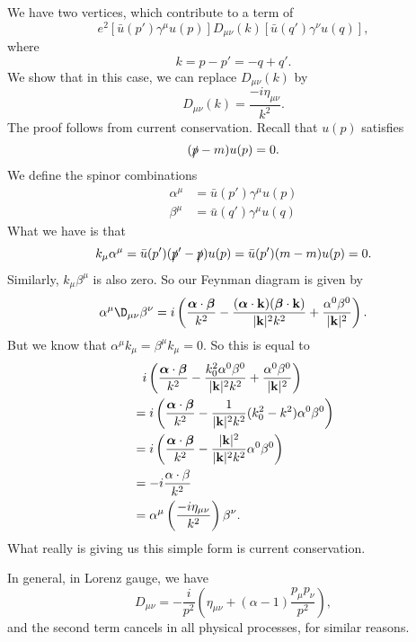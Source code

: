 \documentclass[a4paper]{article}
\begin{document}
\begin{eg}
\begin{center}
  \end{center}
  We have two vertices, which contribute to a term of
  \[
    e^2 [\bar{u}(p') \gamma^\mu u(p)] D_{\mu\nu}(k)[\bar{u}(q') \gamma^\nu u(q)],
  \]
  where
  \[
    k = p - p' = -q + q'.
  \]
  We show that in this case, we can replace $D_{\mu\nu}(k)$ by
  \[
    D_{\mu\nu}(k) = \frac{-i \eta_{\mu\nu}}{k^2}.
  \]
  The proof follows from current conservation. Recall that $u(p)$ satisfies
  \[
    (\slashed p - m) u(p) = 0.
  \]
  We define the spinor combinations
  \begin{align*}
    \alpha^\mu &= \bar{u}(p') \gamma^\mu u(p)\\
    \beta^\mu &= \bar{u}(q') \gamma^\mu u(q)
  \end{align*}
  What we have is that
  \[
    k_\mu \alpha^\mu = \bar{u} (p')(\slashed p' - \slashed p) u(p) = \bar{u}(p')(m - m) u(p) = 0.
  \]
  Similarly, $k_\mu \beta^\mu$ is also zero. So our Feynman diagram is given by
  \[
    \alpha^\mu \D_{\mu\nu} \beta^\nu = i\left(\frac{\boldsymbol\alpha \cdot \boldsymbol\beta}{k^2} - \frac{(\boldsymbol\alpha\cdot \mathbf{k})(\boldsymbol\beta \cdot \mathbf{k})}{|\mathbf{k}|^2 k^2} + \frac{\alpha^0 \beta^0}{|\mathbf{k}|^2}\right).
  \]
  But we know that $\alpha^\mu k_\mu = \beta^\mu k_\mu = 0$. So this is equal to
  \begin{align*}
    &\hphantom{=}i\left(\frac{\boldsymbol\alpha \cdot \boldsymbol\beta}{k^2} - \frac{k_0^2 \alpha^0 \beta^0}{|\mathbf{k}|^2 k^2} + \frac{\alpha^0 \beta^0}{|\mathbf{k}|^2}\right)\\
    &= i\left(\frac{\boldsymbol \alpha\cdot \boldsymbol\beta}{k^2} - \frac{1}{|\mathbf{k}|^2 k^2}(k_0^2 - k^2) \alpha^0 \beta^0\right)\\
    &= i\left(\frac{\boldsymbol \alpha\cdot \boldsymbol\beta}{k^2} - \frac{|\mathbf{k}|^2}{|\mathbf{k}|^2 k^2} \alpha^0 \beta^0\right)\\
    &= -i \frac{\alpha \cdot \beta}{k^2} \\
    &= \alpha^\mu \left(\frac{-i \eta_{\mu\nu}}{k^2}\right)\beta^\nu.
  \end{align*}
  What really is giving us this simple form is current conservation.
\end{eg}
In general, in Lorenz gauge, we have
\[
  D_{\mu\nu} = -\frac{i}{p^2} \left(\eta_{\mu\nu} + (\alpha - 1) \frac{p_\mu p_\nu}{p^2}\right),
\]
and the second term cancels in all physical processes, for similar reasons.
\end{document}
